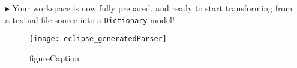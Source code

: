\begin{itemize}
\item[$\blacktriangleright$] Your workspace is now fully prepared, and ready to start transforming from a textual file source into a \texttt{Dictionary} model!

\begin{figure}[htpb]
\begin{center}
  \texttt{[image: eclipse\_generatedParser]}
  \caption{figureCaption}
  \label{eclipse:generatedParser}
\end{center}
\end{figure}


\end{itemize}
